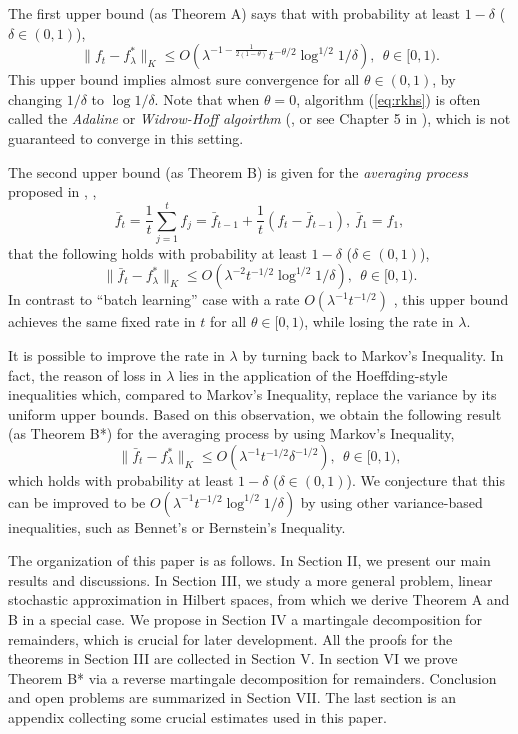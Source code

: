 \documentclass[twoside,twocolumn,journal]{IEEEtran}
\begin{document}
The first upper bound (as Theorem A) says that with probability at least $1-\delta$ ($\delta\in (0,1)$),
\[ \|f_t-f^\ast_\lambda\|_K \leq O(\lambda^{-1 - \frac{1}{2(1-\theta)}} t^{-\theta/2}\log^{1/2} 1/\delta), \ \ \mbox{$\theta\in [0,1)$}. \]
This upper bound implies almost sure convergence for all $\theta\in (0,1)$, by changing $1/\delta$ to $\log 1/\delta$. Note that
when $\theta=0$, algorithm (\ref{eq:rkhs}) is often called the \emph{Adaline} or \emph{Widrow-Hoff algoirthm}
(\cite{WidHof60}, or see Chapter 5 in \cite{CriSha00}),
which is not guaranteed to converge in this setting.

The second upper bound (as Theorem B) is given for the \emph{averaging process} proposed in \cite{Polyak90}, \cite{Ruppert88},
\begin{equation} \label{eq:averaging}
 \bar{f}_t = \frac{1}{t} \sum_{j=1}^t f_j = \bar{f}_{t-1} + \frac{1}{t} (f_t - \bar{f}_{t-1}), \ \bar{f}_1=f_1,
\end{equation}
that the following holds with probability at least $1-\delta$ ($\delta\in (0,1)$),
\[ \|\bar{f}_t - f^\ast_\lambda\|_K \leq O(\lambda^{-2}t^{-1/2} \log^{1/2} 1/\delta), \ \ \mbox{$\theta \in [0,1)$}. \]
In contrast to ``batch learning'' case with a rate $O(\lambda^{-1} t^{-1/2})$ \cite{SmaZho-ShannonIII}, this upper bound achieves the same fixed rate
in $t$ for all $\theta\in [0,1)$, while losing the rate in $\lambda$.

It is possible to improve the rate in $\lambda$ by turning back to Markov's Inequality. In fact, the reason of loss in $\lambda$ lies in the application
of the Hoeffding-style inequalities which, compared to Markov's Inequality, replace the variance by its uniform upper bounds.
Based on this observation, we obtain the following result (as Theorem B*) for the averaging process by using Markov's Inequality,
\[ \|\bar{f}_t - f^\ast_\lambda\|_K \leq O(\lambda^{-1}t^{-1/2} \delta^{-1/2}), \ \ \mbox{$\theta \in [0,1)$}, \]
which holds with probability at least $1-\delta$ ($\delta\in (0,1)$). We conjecture that this can be improved to be 
$O(\lambda^{-1} t^{-1/2} \log^{1/2}1/\delta)$ by using other variance-based inequalities, such as Bennet's or Bernstein's Inequality.

The organization of this paper is as follows. In Section II, we present our main results and discussions. In Section III, we study
a more general problem, linear stochastic approximation in Hilbert spaces, from which we derive Theorem A and B in a special case.
We propose in Section IV a martingale decomposition for remainders, which is crucial for later development. All the proofs for the theorems in Section III
are collected in Section V. In section VI we prove Theorem B* via a reverse martingale decomposition for remainders. Conclusion and open problems
are summarized in Section VII. The last section is an appendix collecting some crucial estimates used in this paper.
\end{document}
